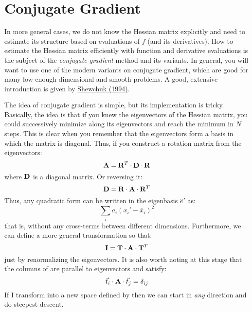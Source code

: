 \section{Conjugate Gradient}

In more general cases, we do not know the Hessian matrix explicitly
and need to estimate its structure based on evaluations of $f$ (and
its derivatives). How to estimate the Hessian matrix efficiently with 
function and derivative evaluations is the subject of the {\it
  conjugate gradient} method and its variants. In general, you will
want to use one of the modern variants on conjugate gradient, which
are good for many low-enough-dimensional and smooth problems. A good,
extensive introduction is given by
\href{http://www.cs.cmu.edu/~jrs/jrspapers.html}{\color{red} Shewchuk
  (1994)}.

The idea of conjugate gradient is simple, but its implementation is
tricky. Basically, the idea is that if you knew the eigenvectors of
the Hessian matrix, you could successively minimize along its
eigenvectors and reach the minimum in $N$ steps. This is clear when
you remember that the eigenvectors form a basis in which the matrix is
diagonal. Thus, if you construct a rotation matrix  from the
eigenvectors:
\begin{equation}
{\bf A} = {\bf R}^T \cdot {\bf D} \cdot {\bf R}
\end{equation}
where ${\bf D}$ is a diagonal matrix. Or reversing it:
\begin{equation}
{\bf D} = {\bf R} \cdot {\bf A} \cdot {\bf R}^T
\end{equation}
Thus, any quadratic form can be written in the eigenbasis ${\hat e}'$
as:
\begin{equation}
\sum_i a_i (x_i' - {\bar x}_i)^2
\end{equation}
that is, without any cross-terms between different
dimensions. Furthermore, we can define a more general transformation
 so that:
\begin{equation}
{\bf I} = {\bf T} \cdot {\bf A} \cdot {\bf T}^T
\end{equation}
just by renormalizing the eigenvectors. It is also worth noting at
this stage that the columns of  are parallel to eigenvectors
and satisfy:
\begin{equation}
\vec{t}_i \cdot{\bf A}\cdot \vec{t}_j = \delta_{ij}
\end{equation}
If I transform into a new space defined by  then we can start
in {\it any} direction and do steepest descent.

